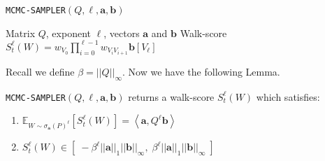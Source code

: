 \begin{algorithm}[ht]
\caption{\texttt{MCMC-SAMPLER}$(Q, {\ell}, \mathbf{a}, \mathbf{b})$}
\label{alg:fwalk}
\begin{algorithmic}[1]
\REQUIRE Matrix $Q$, exponent ${\ell}$, vectors $\mathbf{a}$ and $\mathbf{b}$
\RETURN Walk-score $S_{t}^{\ell}(W) = w_{V_0}\prod_{i=0}^{{\ell}-1}w_{V_iV_{i+1}}\mathbf{b}[V_{\ell}]$
\end{algorithmic}
\end{algorithm} 


Recall we define $\beta = ||Q||_{\infty}$. 
Now we have the following Lemma.
\begin{lemma}
\texttt{MCMC-SAMPLER}$(Q, {\ell},\mathbf{a},\mathbf{b})$ returns a walk-score $S_{t}^{\ell}(W)$ which satisfies:
\begin{enumerate}
\item $\mathbb{E}_{W \sim \sigma_{\mathbf{a}}(P)^{\ell}} \left[S_{t}^{\ell}(W)\right] = \left<\mathbf{a}, Q^{\ell}\mathbf{b} \right>$
\item $S_{t}^{\ell}(W) \in [\;-\beta^{\ell}||\mathbf{a}||_1||\mathbf{b}||_{\infty} ,\; \beta^{\ell}||\mathbf{a}||_1||\mathbf{b}||_{\infty} \;]$
\end{enumerate}
\end{lemma}


